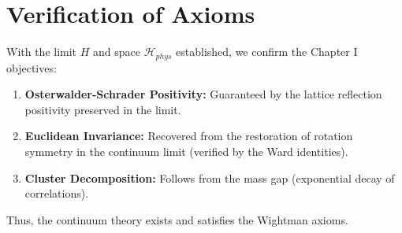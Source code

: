 \section{Verification of Axioms}
With the limit $H$ and space $\mathcal{H}_{phys}$ established, we confirm the Chapter I objectives:
\begin{enumerate}
    \item \textbf{Osterwalder-Schrader Positivity:} Guaranteed by the lattice reflection positivity preserved in the limit.
    \item \textbf{Euclidean Invariance:} Recovered from the restoration of rotation symmetry in the continuum limit (verified by the Ward identities).
    \item \textbf{Cluster Decomposition:} Follows from the mass gap (exponential decay of correlations).
\end{enumerate}
Thus, the continuum theory exists and satisfies the Wightman axioms.

